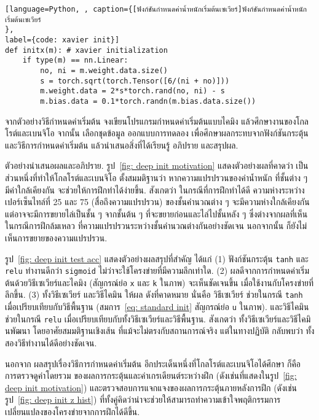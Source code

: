 \begin{lstlisting}[language=Python, , caption={[ฟังก์ชันกำหนดค่าน้ำหนักเริ่มต้นเซเวียร์]ฟังก์ชันกำหนดค่าน้ำหนักเริ่มต้นเซเวียร์
}, 
label={code: xavier init}]
def initx(m): # xavier initialization
    if type(m) == nn.Linear:        
        no, ni = m.weight.data.size()
        s = torch.sqrt(torch.Tensor([6/(ni + no)]))
        m.weight.data = 2*s*torch.rand(no, ni) - s
        m.bias.data = 0.1*torch.randn(m.bias.data.size())        
\end{lstlisting}

\begin{Exercise}
	\label{ex: deep init}

จากตัวอย่างวิธีกำหนดค่าเริ่มต้น
จงเขียนโปรแกรมกำหนดค่าเริ่มต้นแบบไคมิง
แล้วศึกษางานของโกลโรต์และเบนจิโอ\cite{GlorotAISTATS2010}
จากนั้น 
เลือกชุดข้อมูล 
ออกแบบการทดลอง เพื่อศึกษาผลกระทบจากฟังก์ชันกระตุ้น
และวิธีการกำหนดค่าเริ่มต้น
แล้วนำเสนอสิ่งที่ได้เรียนรู้ อภิปราย และสรุปผล.

ตัวอย่างนำเสนอผลและอภิปราย.
รูป~\ref{fig: deep init motivation}
แสดงตัวอย่างผลที่คาดว่า
เป็นส่วนหนึ่งที่ทำให้โกลโรต์และเบนจิโอ\cite{GlorotAISTATS2010}
ตั้งสมมติฐานว่า 
หากความแปรปรวนของค่าน้ำหนัก
ที่ชั้นต่าง ๆ มีค่าใกล้เคียงกัน
จะช่วยให้การฝึกทำได้ง่ายขึ้น.
สังเกตว่า
ในกรณีที่การฝึกทำได้ดี
ความห่างระหว่างเปอร์เซ็นไทล์ที่ 25 และ 75 (สื่อถึงความแปรปรวน) ของชั้นคำนวณต่าง ๆ จะมีความห่างใกล้เคียงกัน 
แต่อาจจะมีการขยายไล่เป็นชั้น ๆ จากชั้นต้น ๆ ที่จะขยายก่อนและไล่ไปชั้นหลัง ๆ
ซึ่งต่างจากผลที่เห็น ในกรณีการฝึกล้มเหลว ที่ความแปรปรวนระหว่างชั้นคำนวณต่างกันอย่างชัดเจน นอกจากนั้น ก็ยังไม่เห็นการขยายของความแปรปรวน.


รูป~\ref{fig: deep init test acc}
แสดงตัวอย่างผลสรุปที่สำคัญ
ได้แก่
(1) ฟังก์ชันกระตุ้น \texttt{tanh} และ \texttt{relu} ทำงานดีกว่า \texttt{sigmoid} ไม่ว่าจะใช้โครงข่ายที่มีความลึกเท่าใด.
(2) ผลดีจากการกำหนดค่าเริ่มต้นด้วยวิธีเซเวียร์และไคมิง (สัญกรณ์ย่อ \texttt{x} และ \texttt{k} ในภาพ)
จะเห็นชัดเจนขึ้น เมื่อใช้งานกับโครงข่ายที่ลึกขึ้น.
(3)
ทั้งวิธีเซเวียร์ และวิธีไคมิน
ให้ผล ดังที่คาดหมาย
นั่นคือ
วิธีเซเวียร์ ช่วยในกรณี \texttt{tanh} เมื่อเปรียบเทียบกับวิธีพื้นฐาน (สมการ~\ref{eq: standard init} สัญกรณ์ย่อ \texttt{u} ในภาพ).
และวิธีไคมิน
ช่วยในกรณี
\texttt{relu}
เมื่อเปรียบเทียบกับทั้งวิธีเซเวียร์และวิธีพื้นฐาน.
สังเกตว่า ทั้งวิธีเซเวียร์และวิธีไคมินพัฒนา โดยอาศัยสมมติฐานเชิงเส้น
ที่แม้จะไม่ตรงกับสถานการณ์จริง
แต่ในทางปฏิบัติ
กลับพบว่า
ทั้งสองวิธีทำงานได้ดีอย่างชัดเจน.

นอกจาก ผลสรุปเรื่องวิธีการกำหนดค่าเริ่มต้น
อีกประเด็นหนึ่งที่โกลโรต์และเบนจิโอ\cite{GlorotAISTATS2010}ได้ศึกษา
ก็คือ 
การตรวจดูค่าโดยรวม
ของผลการกระตุ้นและค่าเกรเดียนต์ระหว่างฝึก (ดังเช่นที่แสดงในรูป~\ref{fig: deep init motivation})
และตรวจสอบการแจกแจงของผลการกระตุ้นภายหลังการฝึก (ดังเช่นรูป~\ref{fig: deep init z hist})
ที่ทั้งคู่คิดว่าน่าจะช่วยให้สามารถทำความเข้าใจพฤติกรรมการเปลี่ยนแปลงของโครงข่ายจากการฝึกได้ดีขึ้น.



\end{Exercise}
